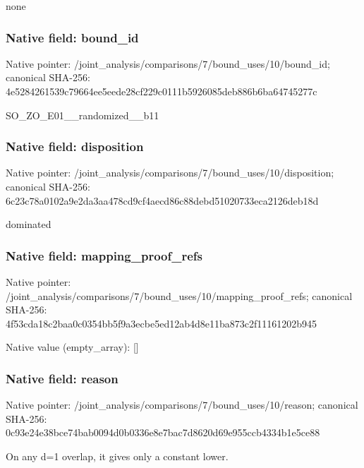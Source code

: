 \documentclass[10pt,a4paper]{article}
\begin{document}
\begingroup\raggedright\sloppy none\par\endgroup

\subsubsection{Native field: bound\_\allowbreak{}id}
Native pointer: /joint\_\allowbreak{}analysis/comparisons/7/bound\_\allowbreak{}uses/10/bound\_\allowbreak{}id; canonical SHA-256: 4e5284261539c79664ee5eede28cf229c0111b5926085deb886b6ba64745277c

\begingroup\raggedright\sloppy SO\_\allowbreak{}ZO\_\allowbreak{}E01\_\allowbreak{}\_\allowbreak{}randomized\_\allowbreak{}\_\allowbreak{}b11\par\endgroup

\subsubsection{Native field: disposition}
Native pointer: /joint\_\allowbreak{}analysis/comparisons/7/bound\_\allowbreak{}uses/10/disposition; canonical SHA-256: 6c23c78a0102a9e2da3aa478cd9cf4aecd86c88debd51020733eca2126deb18d

\begingroup\raggedright\sloppy dominated\par\endgroup

\subsubsection{Native field: mapping\_\allowbreak{}proof\_\allowbreak{}refs}
Native pointer: /joint\_\allowbreak{}analysis/comparisons/7/bound\_\allowbreak{}uses/10/mapping\_\allowbreak{}proof\_\allowbreak{}refs; canonical SHA-256: 4f53cda18c2baa0c0354bb5f9a3ecbe5ed12ab4d8e11ba873c2f11161202b945

Native value (empty\_\allowbreak{}array): []

\subsubsection{Native field: reason}
Native pointer: /joint\_\allowbreak{}analysis/comparisons/7/bound\_\allowbreak{}uses/10/reason; canonical SHA-256: 0c93e24e38bce74bab0094d0b0336e8e7bac7d8620d69e955ccb4334b1e5ce88

\begingroup\raggedright\sloppy On any d=\allowbreak{}1 overlap,\allowbreak{} it gives only a constant lower.\par\endgroup
\end{document}
